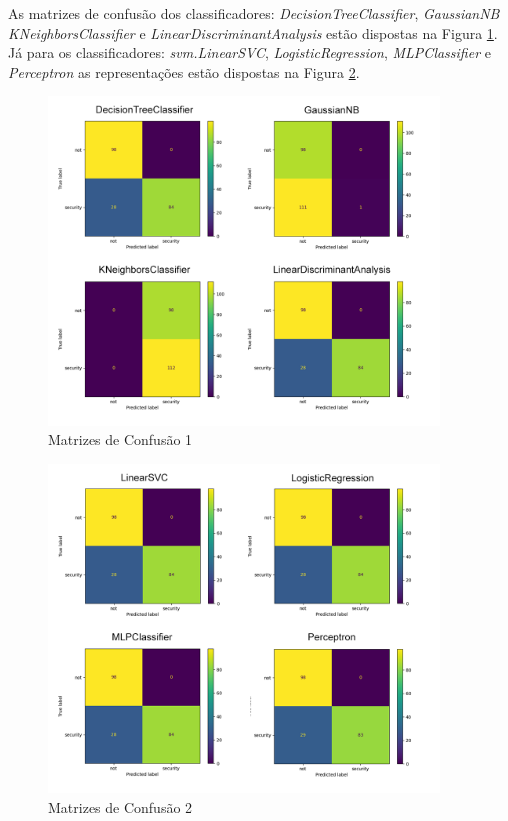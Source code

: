 \documentclass[conference]{IEEEtran}
\begin{document}
As matrizes de confusão dos classificadores: \textit{DecisionTreeClassifier}, \textit{GaussianNB} \textit{KNeighborsClassifier} e \textit{LinearDiscriminantAnalysis} estão dispostas na Figura \ref{fig:conf_mat_1}. Já para os classificadores: \textit{svm.LinearSVC}, \textit{LogisticRegression}, \textit{MLPClassifier} e \textit{Perceptron} as representações estão dispostas na Figura \ref{fig:conf_mat_2}.

\begin{figure}[htbp]
    \centerline{\includegraphics[width=28em]{images/conf_mat_1.png}}
    \caption{Matrizes de Confusão 1}
    \label{fig:conf_mat_1}
\end{figure}

\begin{figure}[htbp]
    \centerline{\includegraphics[width=28em]{images/conf_mat_2.png}}
    \caption{Matrizes de Confusão 2}
    \label{fig:conf_mat_2}
\end{figure}
\end{document}
